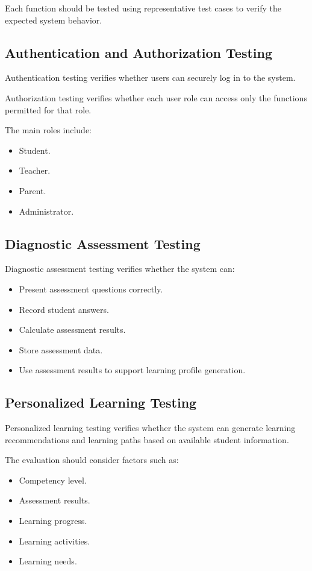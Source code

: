 Each function should be tested using representative test cases to verify the expected system behavior.

\subsection{Authentication and Authorization Testing}

Authentication testing verifies whether users can securely log in to the system.

Authorization testing verifies whether each user role can access only the functions permitted for that role.

The main roles include:

\begin{itemize}
	\item Student.
	\item Teacher.
	\item Parent.
	\item Administrator.
\end{itemize}

\subsection{Diagnostic Assessment Testing}

Diagnostic assessment testing verifies whether the system can:

\begin{itemize}
	\item Present assessment questions correctly.
	\item Record student answers.
	\item Calculate assessment results.
	\item Store assessment data.
	\item Use assessment results to support learning profile generation.
\end{itemize}

\subsection{Personalized Learning Testing}

Personalized learning testing verifies whether the system can generate learning recommendations and learning paths based on available student information.

The evaluation should consider factors such as:

\begin{itemize}
	\item Competency level.
	\item Assessment results.
	\item Learning progress.
	\item Learning activities.
	\item Learning needs.
\end{itemize}

